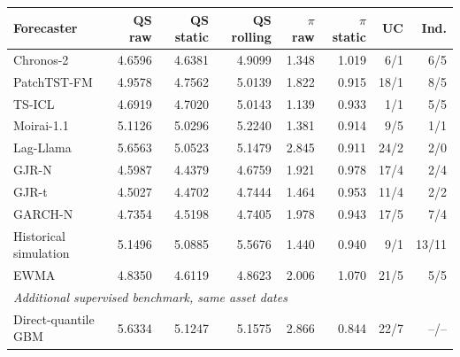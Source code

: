 \begingroup\setlength{\tabcolsep}{3.5pt}
\begin{tabular}{lrrrrrrr}
\toprule
Forecaster & QS raw & QS static & QS rolling & $\pi$ raw & $\pi$ static & UC & Ind. \\
\midrule
Chronos-2 & 4.6596 & 4.6381 & 4.9099 & 1.348 & 1.019 & 6/1 & 6/5 \\
PatchTST-FM & 4.9578 & 4.7562 & 5.0139 & 1.822 & 0.915 & 18/1 & 8/5 \\
TS-ICL & 4.6919 & 4.7020 & 5.0143 & 1.139 & 0.933 & 1/1 & 5/5 \\
Moirai-1.1 & 5.1126 & 5.0296 & 5.2240 & 1.381 & 0.914 & 9/5 & 1/1 \\
Lag-Llama & 5.6563 & 5.0523 & 5.1479 & 2.845 & 0.911 & 24/2 & 2/0 \\
GJR-N & 4.5987 & 4.4379 & 4.6759 & 1.921 & 0.978 & 17/4 & 2/4 \\
GJR-t & 4.5027 & 4.4702 & 4.7444 & 1.464 & 0.953 & 11/4 & 2/2 \\
GARCH-N & 4.7354 & 4.5198 & 4.7405 & 1.978 & 0.943 & 17/5 & 7/4 \\
Historical simulation & 5.1496 & 5.0885 & 5.5676 & 1.440 & 0.940 & 9/1 & 13/11 \\
EWMA & 4.8350 & 4.6119 & 4.8623 & 2.006 & 1.070 & 21/5 & 5/5 \\
\midrule
\multicolumn{8}{l}{\emph{Additional supervised benchmark, same asset dates}} \\
Direct-quantile GBM & 5.6334 & 5.1247 & 5.1575 & 2.866 & 0.844 & 22/7 & --/-- \\
\bottomrule
\end{tabular}
\endgroup

